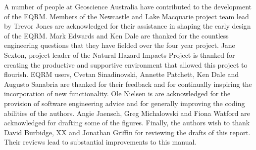 \documentclass[a4paper, 12pt]{report}
\begin{document}
A number of people at Geoscience Australia have contributed to the
development of the EQRM. Members of the Newcastle and Lake Macquarie
project team lead by Trevor Jones are acknowledged for their
assistance in shaping the early design of the EQRM. Mark Edwards and
Ken Dale are thanked for the countless engineering questions that they
have fielded over the four year project. Jane Sexton, project leader
of the Natural Hazard Impacts Project is thanked for creating the
productive and supportive environment that allowed this project to
flourish. EQRM users, Cvetan Sinadinovski, Annette Patchett, Ken Dale
and Augusto Sanabria are thanked for their feedback and for
continually inspiring the incorporation of new functionality. Ole
Nielsen is are acknowledged for the provision of software engineering
advice and for generally improving the coding abilities of the
authors. Angie Jaensch, Greg Michalowski and Fiona Watford are
acknowledged for drafting some of the figures.  Finally, the authors
wish to thank David Burbidge, XX and Jonathan Griffin for reviewing
the drafts of this report. Their reviews lead to substantial
improvements to this manual.


\tableofcontents

\newpage
{}









\appendix


\small

%
\printindex
\end{document}
